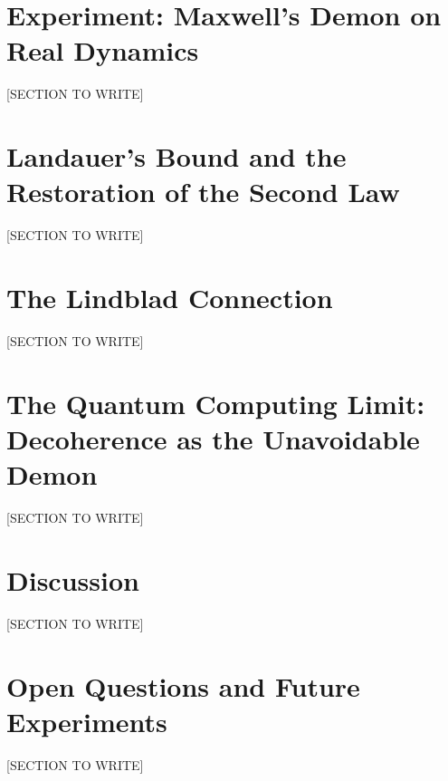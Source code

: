 \documentclass[12pt]{article}
\begin{document}
\section{Experiment: Maxwell's Demon on Real Dynamics}
\label{sec:demon}
[SECTION TO WRITE]

\section{Landauer's Bound and the Restoration of the Second Law}
\label{sec:landauer}
[SECTION TO WRITE]

\section{The Lindblad Connection}
\label{sec:lindblad}
[SECTION TO WRITE]

\section{The Quantum Computing Limit: Decoherence as the Unavoidable Demon}
\label{sec:quantum}
[SECTION TO WRITE]

\section{Discussion}
\label{sec:discussion}
[SECTION TO WRITE]

\section{Open Questions and Future Experiments}
\label{sec:open}
[SECTION TO WRITE]


\end{document}
